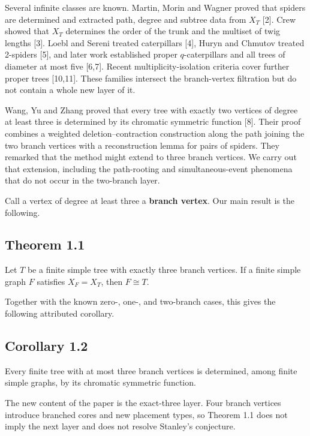 \documentclass[11pt]{article}
\begin{document}
Several infinite classes are known. Martin, Morin and Wagner proved that spiders are determined and
extracted path, degree and subtree data from $X_T$ [2]. Crew showed that $X_T$ determines the order
of the trunk and the multiset of twig lengths [3]. Loebl and Sereni treated caterpillars [4], Huryn
and Chmutov treated 2-spiders [5], and later work established proper $q$-caterpillars and all trees
of diameter at most five [6,7]. Recent multiplicity-isolation criteria cover further proper trees
[10,11]. These families intersect the branch-vertex filtration but do not contain a whole new
layer of it.

Wang, Yu and Zhang proved that every tree with exactly two vertices of degree at least three is
determined by its chromatic symmetric function [8]. Their proof combines a weighted
deletion--contraction construction along the path joining the two branch vertices with a
reconstruction lemma for pairs of spiders. They remarked that the method might extend to three
branch vertices. We carry out that extension, including the path-rooting and simultaneous-event
phenomena that do not occur in the two-branch layer.

Call a vertex of degree at least three a \textbf{branch vertex}. Our main result is the following.

\Needspace{0.13\textheight}
\subsection*{Theorem 1.1}


Let $T$ be a finite simple tree with exactly three branch vertices. If a finite simple graph $F$
satisfies $X_F=X_T$, then $F\cong T$.

Together with the known zero-, one-, and two-branch cases, this gives the following attributed
corollary.

\Needspace{0.13\textheight}
\subsection*{Corollary 1.2}


Every finite tree with at most three branch vertices is determined, among finite simple graphs, by
its chromatic symmetric function.

The new content of the paper is the exact-three layer. Four branch vertices introduce branched
cores and new placement types, so Theorem 1.1 does not imply the next layer and does not resolve
Stanley's conjecture.
\end{document}
